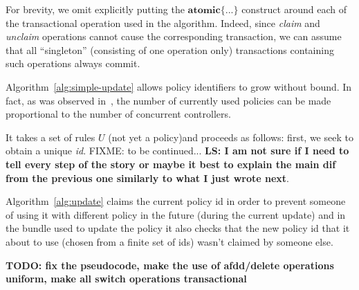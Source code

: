 \documentclass[conference]{sigcomm-alternate}
\newcommand{\hide}[1]{}
\begin{document}
For brevity, we omit explicitly putting the $\textbf{atomic}\{...\}$ construct
around each of the transactional operation used in the algorithm.   
Indeed, since \textit{claim} and \textit{unclaim} operations cannot
cause the corresponding transaction, we can assume that all
``singleton'' (consisting of one operation only)  transactions
containing such operations always commit.    

Algorithm~\ref{alg:simple-update} allows policy identifiers to grow
without bound. In fact, as was observed in~\cite{cpc}, the number of currently
used policies can be made proportional to the number of concurrent
controllers.
 
 
 It takes a set of rules $U$ (not yet a policy)and proceeds as follows: first, we seek to
 obtain a unique \emph{id}. FIXME: to be continued...
 \textbf{LS: I am not sure if I need to tell every step of the story or maybe it best to explain the main dif from the previous one similarly to what I just wrote next}.
 
Algorithm~\ref{alg:update} claims the current policy id in order to prevent someone of using it with different policy in the future (during the current update) and in the bundle used to update the policy it also checks that the new policy id that it about to use (chosen from a finite set of ids) wasn't claimed by someone else. 

\hide{
We compute our new suggested policy by applying the update requests on top of current policy, supporting any kind of requests and policies. Then we make a transaction (using the bundle feature) to atomically check that our policy id is not blocked by anyone else, to change the current policy id to ours (an action that would fail if the current policy id is no longer what we are counting of) and to actually configure our new policy.

If one of the actions in the transaction fails we try again. There is no progress guaranty for each controller but there is one for the whole system - at least one of the controller will succeed in fulfilling its update requirements.
}



\textbf{TODO: fix the pseudocode, make the use of afdd/delete
  operations uniform, make all switch operations transactional}
\end{document}
